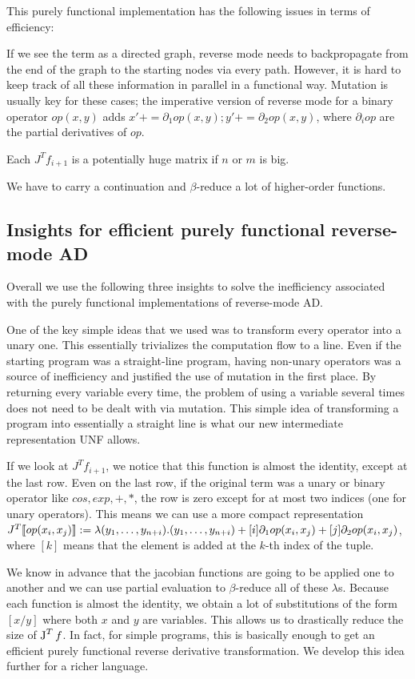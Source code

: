 This purely functional implementation has the following issues in terms of efficiency: 

If we see the term as a directed graph, reverse mode needs to backpropagate from the end of the graph to the starting nodes via every path.
However, it is hard to keep track of all these information in parallel in a functional way.
Mutation is usually key for these cases; 
the imperative version of reverse mode for a binary operator $op(x,y)$ adds $x'+= \partial_1op(x,y);y'+= \partial_2op(x,y)$, 
where $\partial_iop$ are the partial derivatives of $op$.

Each $J^Tf_{i+1}$ is a potentially huge matrix if $n$ or $m$ is big.

We have to carry a continuation and $\beta$-reduce a lot of higher-order functions.

\subsection{Insights for efficient purely functional reverse-mode AD}
\label{subsec:insights}
Overall we use the following three insights to solve the inefficiency associated with the purely functional implementations of reverse-mode AD.

One of the key simple ideas that we used was to transform every operator into a unary one. 
This essentially trivializes the computation flow to a line. 
Even if the starting program was a straight-line program, 
having non-unary operators was a source of inefficiency and justified the use of mutation in the first place.
By returning every variable every time, the problem of using a variable several times does not need to be dealt with via mutation. 
This simple idea of transforming a program into essentially a straight line is what our new intermediate representation UNF allows.

If we look at $J^Tf_{i+1}$, we notice that this function is almost the identity, except at the last row. 
Even on the last row, if the original term was a unary or binary operator like $cos, exp, +, *$, 
the row is zero except for at most two indices (one for unary operators).
This means we can use a more compact representation $J^T\llbracket op(x_i,x_j)\rrbracket:=\lambda (y_1,\ldots,y_{n+i}).(y_1,\ldots,y_{n+i})+[i]\partial_1op(x_i,x_j)+[j]\partial_2op(x_i,x_j)$, 
where $[k]$ means that the element is added at the $k$-th index of the tuple.

We know in advance that the jacobian functions are going to be applied one to another and we can use partial evaluation to $\beta$-reduce all of these $\lambda$s.
Because each function is almost the identity, we obtain a lot of substitutions of the form $[x/y]$ where both $x$ and $y$ are variables. 
This allows us to drastically reduce the size of $\operatorname{J}^Tf$. In fact, for simple programs, this is basically enough to get an efficient purely functional reverse derivative transformation.
We develop this idea further for a richer language.
